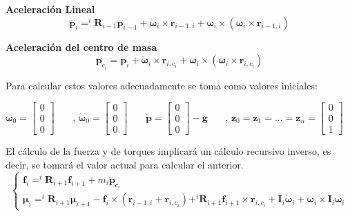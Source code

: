 \textbf{Aceleración Lineal}
\begin{equation*}
    \ddot{\boldsymbol{p}}_i =
    ^{i}\boldsymbol{R}_{i-1}\ddot{\boldsymbol{p}}_{i-1} +
    \dot{\boldsymbol{\omega}}_i\times\boldsymbol{r}_{i-1,i}+\boldsymbol{\omega}_i\times(\boldsymbol{\omega}_i\times\boldsymbol{r}_{i-1,i})
\end{equation*}

\textbf{Aceleración del centro de masa}
\begin{equation*}
    \ddot{\boldsymbol{p}}_{c_i} = \ddot{\boldsymbol{p}}_{i} +
    \dot{\boldsymbol{\omega}}_i\times\boldsymbol{r}_{i,c_i}+\boldsymbol{\omega}_i\times(\boldsymbol{\omega}_i\times\boldsymbol{r}_{i,c_i})
\end{equation*}

Para calcular estos valores adecuadamente se toma como valores
iniciales\cite{fundamentos_robo}:

$\boldsymbol{\omega}_0 = \begin{bmatrix}
        0 \\0\\0
    \end{bmatrix}$ \ \ \ , $\dot{\boldsymbol{\omega}}_0 = \begin{bmatrix}
        0 \\0\\0
    \end{bmatrix}$ \ \ \, $\dot{\boldsymbol{p}} =\begin{bmatrix}
        0 \\0\\0
    \end{bmatrix} - \boldsymbol{g}$ \ \ \ , $\boldsymbol{z}_0 =
    \boldsymbol{z}_1 = ...= \boldsymbol{z}_n  = \begin{bmatrix}
        0 \\0\\1
    \end{bmatrix}$

El cálculo de la fuerza y de torques implicará un cálculo recursivo
inverso, es decir, se tomará el valor actual para calcular el anterior.
\begin{equation}
    \begin{cases}
        \boldsymbol{f}_i = ^{i}\boldsymbol{R}_{i+1} \boldsymbol{f}_{i+1} +
        m_i\boldsymbol{\ddot{p}}_{c_i} \\
        \boldsymbol{\mu}_i = ^{i}\boldsymbol{R}_{i+1}
        \boldsymbol{\mu}_{i+1} -
        \boldsymbol{f}_{i}\times(\boldsymbol{r}_{i-1,i}+\boldsymbol{r}_{i,c_i}) +
        ^{i}\boldsymbol{R}_{i+1}\boldsymbol{f}_{i+1}\times\boldsymbol{r}_{i,c_i} +
        \boldsymbol{I}_i\dot{\boldsymbol{\omega}}_i +
        {\boldsymbol{\omega}}_i\times\boldsymbol{I}_i\boldsymbol{\omega}_i
    \end{cases}
\end{equation}

